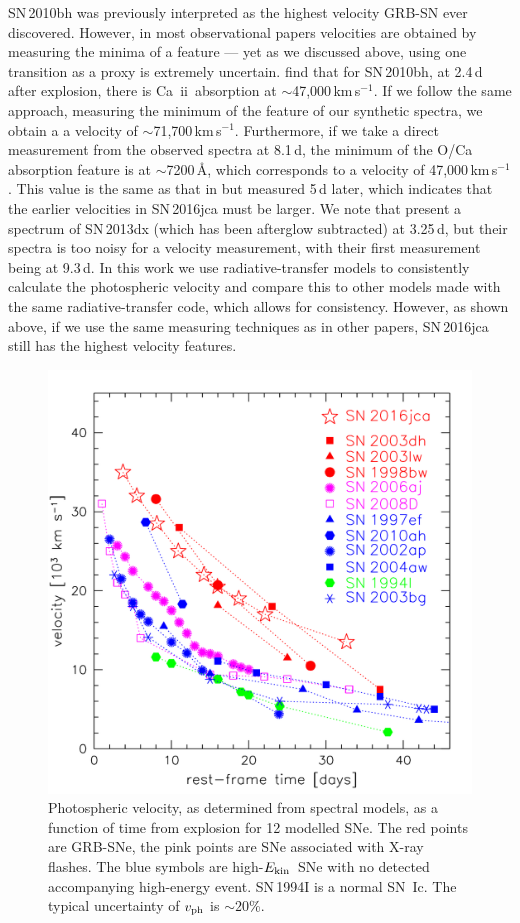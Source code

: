 \documentclass[fleqn,usenatbib]{mnras}
\newcommand{\kms}{km\,s$^{-1}$}
\newcommand{\CaII}{Ca~{\sc ii}}
\newcommand{\KE}{$E_{\rm kin}$}
\newcommand{\ab}{$\sim$}
\begin{document}
SN\,2010bh was previously  interpreted as the highest velocity GRB-SN ever discovered. However, in most observational papers velocities are obtained  by measuring the minima of a feature --- yet as we discussed above, using one transition as a proxy is extremely uncertain. 
\cite{Bufano2012} find that for SN\,2010bh, at 2.4\,d after explosion,
 there is \CaII\ absorption at \ab47,000\,\kms.
 If we follow the same approach, measuring the minimum of the feature of our synthetic spectra, 
 we obtain a a velocity of  \ab71,700\,\kms. Furthermore, 
 if we take a direct measurement from the observed spectra at 8.1\,d,
 the minimum of the O/Ca absorption feature is at \ab7200\,\AA, 
which corresponds to a velocity of 47,000\,\kms.
 This value is the same as that in \cite{Bufano2012} but measured 5\,d later, which indicates 
that the earlier velocities in SN\,2016jca must be larger. 
We note that \cite{Toy16} present a spectrum of SN\,2013dx (which has been afterglow subtracted) at 3.25\,d, but their spectra is too noisy for a velocity measurement, with their first measurement being at 9.3\,d.  
In this work we use radiative-transfer models to consistently calculate
the photospheric velocity and compare this to other models made with the same radiative-transfer code, which allows for consistency.  However, 
as shown above, if we use the same measuring techniques as in other papers, SN\,2016jca still has the highest velocity features. 


\begin{figure}
\centering
\includegraphics[scale=0.4]{plots/jcavel.pdf}
\caption{Photospheric velocity, as determined from spectral models, as a function of time from explosion for 12 modelled SNe. 
The red points are  GRB-SNe, the pink points are SNe associated with X-ray flashes. The blue symbols
are high-\KE\ SNe with no detected accompanying high-energy event.  SN\,1994I is a normal SN~Ic.
 The typical uncertainty of $v_{\rm ph}$ is 
$\sim 20$\%.}
\label{fig:vel}
\end{figure}
\end{document}
